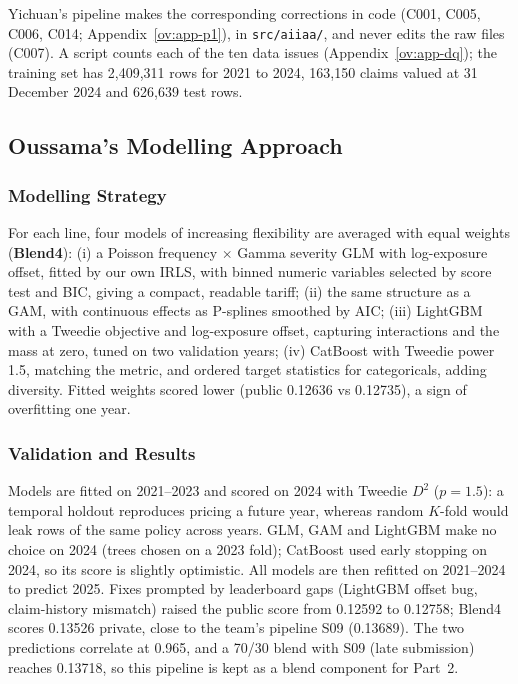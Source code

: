 \documentclass{rapport}
\begin{document}
Yichuan's pipeline makes the corresponding corrections in code (C001, C005, C006, C014; Appendix~\ref{ov:app-p1}), in
\texttt{src/aiiaa/}, and never edits the raw files (C007). A script counts each of the ten data issues
(Appendix~\ref{ov:app-dq}); the training set has 2,409,311 rows for 2021 to 2024, 163,150 claims valued at
31 December 2024 and 626,639 test rows.

\subsection{Oussama's Modelling Approach}

\subsubsection{Modelling Strategy}
For each line, four models of increasing flexibility are averaged with equal weights (\textbf{Blend4}): (i) a Poisson frequency $\times$ Gamma severity GLM with log-exposure offset, fitted by our own IRLS, with binned numeric variables selected by score test and BIC, giving a compact, readable tariff; (ii) the same structure as a GAM, with continuous effects as P-splines smoothed by AIC; (iii) LightGBM with a Tweedie objective and log-exposure offset, capturing interactions and the mass at zero, tuned on two validation years; (iv) CatBoost with Tweedie power 1.5, matching the metric, and ordered target statistics for categoricals, adding diversity. Fitted weights scored lower (public 0.12636 vs 0.12735), a sign of overfitting one year.

\subsubsection{Validation and Results}
Models are fitted on 2021--2023 and scored on 2024 with Tweedie $D^2$ ($p=1.5$): a temporal holdout reproduces pricing a future year, whereas random $K$-fold would leak rows of the same policy across years. GLM, GAM and LightGBM make no choice on 2024 (trees chosen on a 2023 fold); CatBoost used early stopping on 2024, so its score is slightly optimistic. All models are then refitted on 2021--2024 to predict 2025. Fixes prompted by leaderboard gaps (LightGBM offset bug, claim-history mismatch) raised the public score from 0.12592 to 0.12758; Blend4 scores 0.13526 private, close to the team's pipeline S09 (0.13689). The two predictions correlate at 0.965, and a 70/30 blend with S09 (late submission) reaches 0.13718, so this pipeline is kept as a blend component for Part~2.
\end{document}
